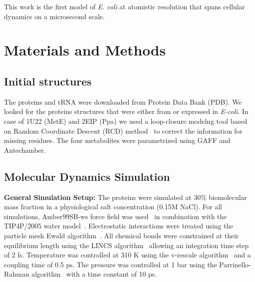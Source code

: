 \documentclass[journal=jacsat,manuscript=article]{achemso}
\begin{document}
This work is the first model of {\em E. coli} at atomistic resolution that spans cellular dynamics on a microsecond scale.




\section*{Materials and Methods}


\subsection*{Initial structures}
The proteins and tRNA were downloaded from Protein Data Bank (PDB). We looked for the proteins structures that were either from or expressed in {\em E-coli}. In case of 1U22 (MetE) and 2EIP (Ppa) we used a loop-closure modelng tool based on Random Coordinate Descent (RCD) method~\cite{Chys2013} to correct the information for missing residues. The four metabolites were parametrized using GAFF and Antechamber. 

\subsection*{Molecular Dynamics Simulation}



 
{\bf General Simulation Setup: }The proteins were simulated at 30\% biomolecular mass fraction in  a physiological salt concentration (0.15M NaCl). For all simulations, Amber99SB-ws force field was used~\cite{Best2014a} in combination with the TIP4P/2005 water model~\cite{Abascal2005b}. Electrostatic interactions were treated using the particle mesh Ewald algorithm~\cite{Essmann1995a}. All chemical bonds were constrained at their equilibrium length using the LINCS algorithm~\cite{Hess2008b} allowing an integration time step of 2 fs. Temperature was controlled at 310 K using the v-rescale algorithm~\cite{Bussi2007a} and a coupling time of 0.5 ps. The pressure was controlled at 1 bar using the Parrinello-Rahman algorithm~\cite{Parrinello1981a} with a time constant of 10 ps.  
\end{document}
